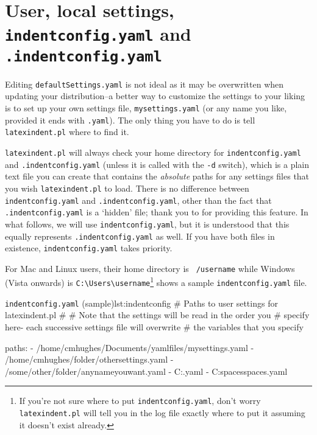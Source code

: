 \section{User, local settings, \texttt{indentconfig.yaml} and \texttt{.indentconfig.yaml}}\label{sec:indentconfig}
 Editing \texttt{defaultSettings.yaml} is not ideal as it may be overwritten when
 updating your distribution--a better way to customize the settings to your liking
 is to set up your own settings file,
 \texttt{mysettings.yaml} (or any name you like, provided it ends with \texttt{.yaml}).
 The only thing you have to do is tell \texttt{latexindent.pl} where to find it.

 \texttt{latexindent.pl} will always check your home directory for \texttt{indentconfig.yaml}
 and  \texttt{.indentconfig.yaml} (unless
 it is called with the \texttt{-d} switch),
 which is a plain text file you can create that contains the \emph{absolute}
 paths for any settings files that you wish \texttt{latexindent.pl} to load. There is no difference
 between \texttt{indentconfig.yaml} and \texttt{.indentconfig.yaml}, other than the
 fact that \texttt{.indentconfig.yaml} is a `hidden' file; thank you to \cite{jacobo-diaz-hidden-config}
 for providing this feature. In what follows, we will use \texttt{indentconfig.yaml}, but it
 is understood that this equally represents \texttt{.indentconfig.yaml} as well. If you
 have both files in existence,  \texttt{indentconfig.yaml} takes priority.

 For Mac and Linux users, their home directory is \texttt{~/username} while
 Windows (Vista onwards) is \lstinline!C:\Users\username!\footnote{If you're not sure
	 where to put \texttt{indentconfig.yaml}, don't
	 worry \texttt{latexindent.pl} will tell you in the log file exactly where to
	 put it assuming it doesn't exist already.}
  shows a sample \texttt{indentconfig.yaml} file.

 \begin{yaml}{\texttt{indentconfig.yaml} (sample)}{lst:indentconfig}
	# Paths to user settings for latexindent.pl
	#
	# Note that the settings will be read in the order you
	# specify here- each successive settings file will overwrite
	# the variables that you specify

	paths:
	- /home/cmhughes/Documents/yamlfiles/mysettings.yaml
	- /home/cmhughes/folder/othersettings.yaml
	- /some/other/folder/anynameyouwant.yaml
	- C:\Users\chughes\Documents\mysettings.yaml
	- C:\Users\chughes\Desktop\test spaces\more spaces.yaml
\end{yaml}

